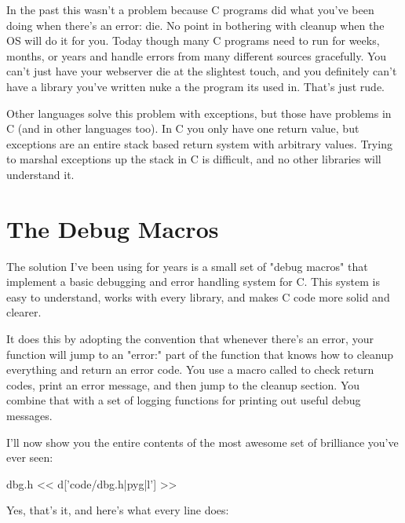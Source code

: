 In the past this wasn't a problem because C programs did what you've
been doing when there's an error: die.  No point in bothering with cleanup
when the OS will do it for you.  Today though many C programs need to run
for weeks, months, or years and handle errors from many different sources
gracefully.  You can't just have your webserver die at the slightest 
touch, and you definitely can't have a library you've written nuke a
the program its used in.  That's just rude.

Other languages solve this problem with exceptions, but those have problems
in C (and in other languages too).  In C you only have one return value,
but exceptions are an entire stack based return system with arbitrary
values.  Trying to marshal exceptions up the stack in C is difficult, and
no other libraries will understand it.

\section{The Debug Macros}

The solution I've been using for years is a small set of "debug macros"
that implement a basic debugging and error handling system for C.  This
system is easy to understand, works with every library, and makes C code
more solid and clearer.

It does this by adopting the convention that whenever there's an error, your
function will jump to an "error:" part of the function that knows how to
cleanup everything and return an error code.  You use a macro called
 to check return codes, print an error message, and then
jump to the cleanup section.  You combine that with a set of logging
functions for printing out useful debug messages.

I'll now show you the entire contents of the most awesome set of brilliance
you've ever seen:

\begin{code}{dbg.h}
<< d['code/dbg.h|pyg|l'] >>
\end{code}

Yes, that's it, and here's what every line does:

